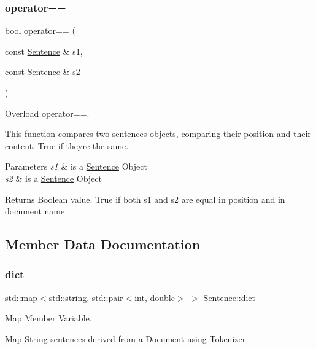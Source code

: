 \subsubsection{\texorpdfstring{operator==}{operator==}}
{\footnotesize\ttfamily bool operator== (\begin{DoxyParamCaption}\item[{const \hyperlink{class_sentence}{Sentence} \&}]{s1,  }\item[{const \hyperlink{class_sentence}{Sentence} \&}]{s2 }\end{DoxyParamCaption})\hspace{0.3cm}{\ttfamily [friend]}}



Overload operator==. 

This function compares two sentences objects, comparing their position and their content. True if they\textquotesingle{}re the same.


\begin{DoxyParams}{Parameters}
{\em s1} & is a \hyperlink{class_sentence}{Sentence} Object \\
\hline
{\em s2} & is a \hyperlink{class_sentence}{Sentence} Object \\
\hline
\end{DoxyParams}
\begin{DoxyReturn}{Returns}
Boolean value. True if both s1 and s2 are equal in position and in document name 
\end{DoxyReturn}


\subsection{Member Data Documentation}
\mbox{\label{class_sentence_a7ea4d420881ba68fcdcc90c296884f42}} 
\subsubsection{\texorpdfstring{dict}{dict}}
{\footnotesize\ttfamily std\+::map$<$std\+::string, std\+::pair$<$int, double$>$ $>$ Sentence\+::dict\hspace{0.3cm}{\ttfamily [private]}}



Map Member Variable. 

Map String sentences derived from a \hyperlink{class_document}{Document} using Tokenizer \mbox{\label{class_sentence_a9db609523d44fb91ff549e0e232d6c8e}} 
